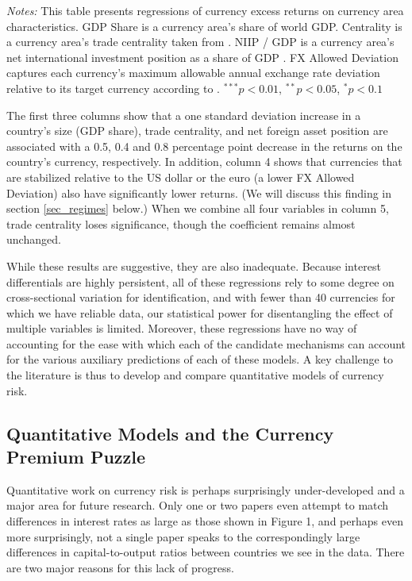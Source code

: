 \documentclass{ar-1col}
\begin{document}
\begin{table}[htp]
\begin{center}
\begin{tabular}{l c c c c c }
\hline
\hline
\end{tabular}
\end{center}
\begin{minipage}[htp!]{\textwidth}
\scriptsize
\emph{Notes:} This table presents regressions of currency excess returns on currency area characteristics. GDP Share is a currency area's share of world GDP. Centrality is a currency area's trade centrality taken from \citet{Richmond2019}. NIIP / GDP is a currency area's net international investment position as a share of GDP \citep{DellaCorteetal2016}. FX Allowed Deviation captures each currency's maximum allowable annual exchange rate deviation relative to its target currency according to \citet{ilzetzki2018exchange}. $^{***}p<0.01$, $^{**}p<0.05$, $^*p<0.1$
\end{minipage}
\end{table}

The first three columns show that a one standard deviation increase in a country's size (GDP share), trade centrality, and net foreign asset position are associated with a 0.5, 0.4 and 0.8 percentage point decrease in the returns on the country's currency, respectively. In addition, column 4 shows that currencies that are stabilized relative to the US dollar or the euro (a lower FX Allowed Deviation) also have significantly lower returns. (We will discuss this finding in section \ref{sec_regimes} below.) When we combine all four variables in column 5, trade centrality loses significance, though the coefficient remains almost unchanged.

While these results are suggestive, they are also inadequate. Because interest differentials are highly persistent, all of these regressions rely to some degree on cross-sectional variation for identification, and with fewer than 40 currencies for which we have reliable data, our statistical power for disentangling the effect of multiple variables is limited. Moreover, these regressions have no way of accounting for the ease with which each of the candidate mechanisms can account for the various auxiliary predictions of each of these models. A key challenge to the literature is thus to develop and compare quantitative models of currency risk.


\subsection{Quantitative Models and the Currency Premium Puzzle \label{section:cpp}}

Quantitative work on currency risk is perhaps surprisingly under-developed and a major area for future research. Only one or two papers even attempt to match differences in interest rates as large as those shown in Figure 1, and perhaps even more surprisingly, not a single paper speaks to the correspondingly large differences in capital-to-output ratios between countries we see in the data. There are two major reasons for this lack of progress.
\end{document}
